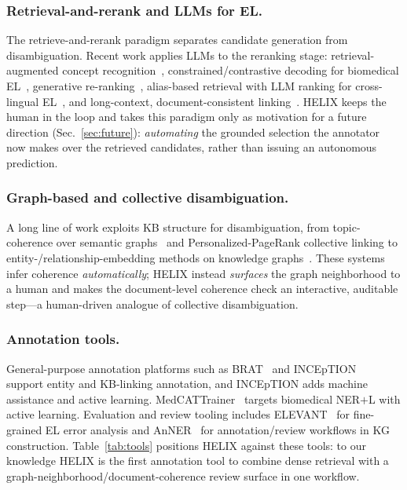 \documentclass[runningheads]{llncs}
\begin{document}
\subsubsection{Retrieval-and-rerank and LLMs for EL.}
The retrieve-and-rerank paradigm separates candidate generation from
disambiguation. Recent work applies LLMs to the reranking stage: retrieval-augmented
concept recognition~\cite{real}, constrained/contrastive decoding for biomedical
EL~\cite{llm4bioel}, generative re-ranking~\cite{belink}, alias-based retrieval
with LLM ranking for cross-lingual EL~\cite{bioelx}, and long-context,
document-consistent linking~\cite{longbel}. HELIX keeps the human in the loop and
takes this paradigm only as motivation for a future direction
(Sec.~\ref{sec:future}): \emph{automating} the grounded selection the annotator now
makes over the retrieved candidates, rather than issuing an autonomous prediction.

\subsubsection{Graph-based and collective disambiguation.}
A long line of work exploits KB structure for disambiguation, from topic-coherence
over semantic graphs~\cite{collective2020} and Personalized-PageRank collective
linking to entity-/relationship-embedding methods on knowledge
graphs~\cite{kgdisamb2021}. These systems infer coherence \emph{automatically};
HELIX instead \emph{surfaces} the graph neighborhood to a human and makes the
document-level coherence check an interactive, auditable step---a
human-driven analogue of collective disambiguation.

\subsubsection{Annotation tools.}
General-purpose annotation platforms such as BRAT~\cite{brat} and
INCEpTION~\cite{inception} support entity and KB-linking annotation, and
INCEpTION adds machine assistance and active learning.
MedCATTrainer~\cite{medcattrainer} targets biomedical NER$+$L with active
learning. Evaluation and review tooling includes ELEVANT~\cite{elevant} for
fine-grained EL error analysis and AnNER~\cite{anner} for annotation/review
workflows in KG construction. Table~\ref{tab:tools} positions HELIX against these
tools: to our knowledge HELIX is the first annotation tool to combine dense
retrieval with a graph-neighborhood/document-coherence review surface in one
workflow.
\end{document}
